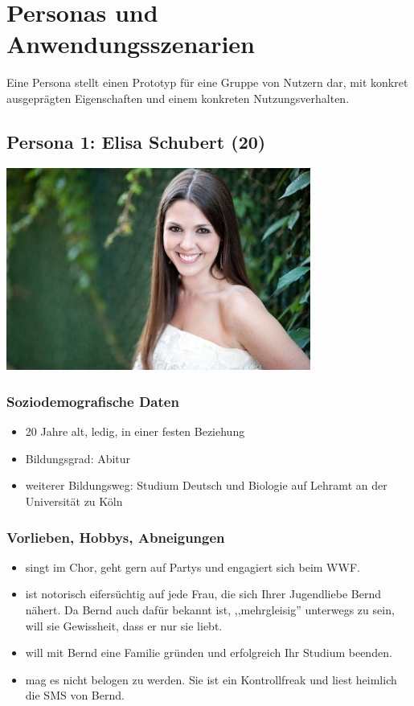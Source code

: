\documentclass[10pt, a4paper, oneside, titlepage]{scrartcl} %
\begin{document}
   	\section{Personas und Anwendungsszenarien}
   	Eine Persona stellt einen Prototyp für eine Gruppe von Nutzern dar, mit konkret ausgeprägten Eigenschaften und einem konkreten Nutzungsverhalten.
   	
	\subsection{Persona 1: Elisa Schubert (20)}
	\begin{center}
		\includegraphics[width=10.0cm]{persona_01.jpg}
	\end{center}
	\subsubsection{Soziodemografische Daten}
	\begin{itemize}		
		\item{}20 Jahre alt, ledig, in einer festen Beziehung
		\item{}Bildungsgrad: Abitur
		\item{}weiterer Bildungsweg: Studium Deutsch und Biologie auf Lehramt an der Universität zu Köln
	\end{itemize}	   

	\subsubsection{Vorlieben, Hobbys, Abneigungen}
	\begin{itemize}
		\item{}singt im Chor, geht gern auf Partys und engagiert sich beim WWF.
		\item{}ist notorisch eifersüchtig auf jede Frau, die sich Ihrer Jugendliebe Bernd nähert. Da Bernd auch dafür bekannt ist, ,,mehrgleisig'' unterwegs zu sein, 		will sie Gewissheit, dass er nur sie liebt.
		\item{}will mit Bernd eine Familie gründen und erfolgreich Ihr Studium beenden.
		\item{}mag es nicht belogen zu werden. Sie ist ein Kontrollfreak und liest heimlich die SMS von Bernd.
	\end{itemize}	   
\end{document}
